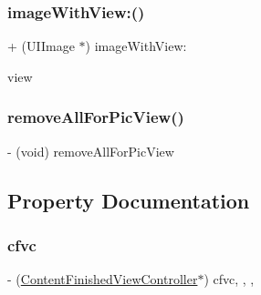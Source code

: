 \subsubsection{\texorpdfstring{image\+With\+View\+:()}{imageWithView:()}}
{\footnotesize\ttfamily + (U\+I\+Image $\ast$) image\+With\+View\+: \begin{DoxyParamCaption}\item[{(U\+I\+View $\ast$)}]{view }\end{DoxyParamCaption}}

\hypertarget{interface_picture_editor_view_a2b2f1812795f418b325b47bf265c5f9f}{}\label{interface_picture_editor_view_a2b2f1812795f418b325b47bf265c5f9f} 
\subsubsection{\texorpdfstring{remove\+All\+For\+Pic\+View()}{removeAllForPicView()}}
{\footnotesize\ttfamily -\/ (void) remove\+All\+For\+Pic\+View \begin{DoxyParamCaption}{ }\end{DoxyParamCaption}}



\subsection{Property Documentation}
\hypertarget{interface_picture_editor_view_a4f7a89c8a7b46f92f71f969a3a5dc14e}{}\label{interface_picture_editor_view_a4f7a89c8a7b46f92f71f969a3a5dc14e} 
\subsubsection{\texorpdfstring{cfvc}{cfvc}}
{\footnotesize\ttfamily -\/ (\hyperlink{interface_content_finished_view_controller}{Content\+Finished\+View\+Controller}$\ast$) cfvc\hspace{0.3cm}{\ttfamily [read]}, {\ttfamily [write]}, {\ttfamily [nonatomic]}, {\ttfamily [weak]}}

\hypertarget{interface_picture_editor_view_a5f4bd87d14e0115689eb192441d272d4}{}\label{interface_picture_editor_view_a5f4bd87d14e0115689eb192441d272d4} 
